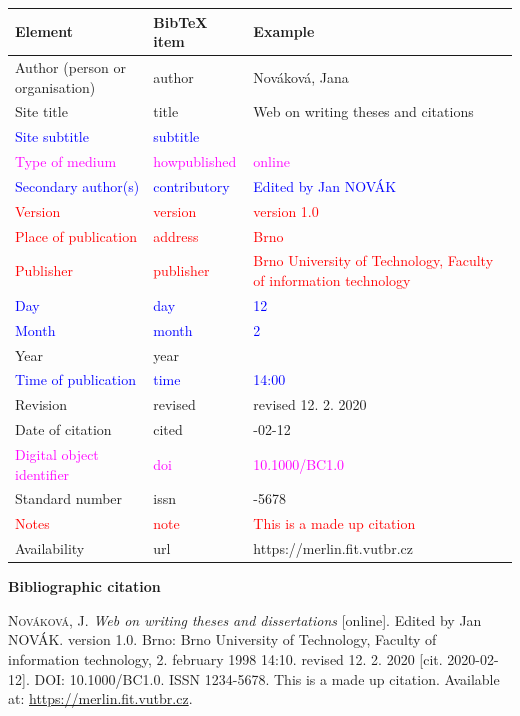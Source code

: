 \begin{tabularx}{0.95\linewidth}{X X >{\raggedright\arraybackslash}X}
    Element & BibTeX item & Example\\\hline
    Author (person or organisation) & author & Nováková, Jana\\
    Site title & title & Web on writing theses and citations\\
    \textcolor{blue}{Site subtitle} &  \textcolor{blue}{subtitle} & \\
    \textcolor{magenta}{Type of medium} & \textcolor{magenta}{howpublished} & \textcolor{magenta}{online}\\
    \textcolor{blue}{Secondary author(s)} & \textcolor{blue}{contributory} & \textcolor{blue}{Edited by Jan NOVÁK}\\
    \textcolor{red}{Version} & \textcolor{red}{version} & \textcolor{red}{version 1.0}\\
    \textcolor{red}{Place of publication} & \textcolor{red}{address} & \textcolor{red}{Brno}\\
    \textcolor{red}{Publisher} & \textcolor{red}{publisher} & \textcolor{red}{Brno University of Technology, Faculty of information technology}\\
    \textcolor{blue}{Day} & \textcolor{blue}{day} & \textcolor{blue}{12}\\
    \textcolor{blue}{Month} & \textcolor{blue}{month} & \textcolor{blue}{2}\\
    Year & year & 2020\\
    \textcolor{blue}{Time of publication} & \textcolor{blue}{time} & \textcolor{blue}{14:00}\\
    Revision & revised & revised 12. 2. 2020\\
    Date of citation & cited & 2020-02-12\\
    \textcolor{magenta}{Digital object identifier} & \textcolor{magenta}{doi} & \textcolor{magenta}{10.1000/BC1.0}\\
    Standard number & issn & 1234-5678\\
    \textcolor{red}{Notes} & \textcolor{red}{note} & \textcolor{red}{This is a made up citation}\\
    Availability & url & https://merlin.fit.vutbr.cz
\end{tabularx}

\bigskip

\noindent \textbf{Bibliographic citation}

\medskip

\noindent \textsc{Nováková}, J. \textit{Web on writing theses and dissertations} [online]. Edited by Jan NOVÁK. version 1.0. Brno: Brno University of Technology, Faculty of information technology, 2. february 1998 14:10. revised 12. 2. 2020 [cit. 2020-02-12]. DOI: 10.1000/BC1.0. ISSN 1234-5678. This is a made up citation. Available at: \url{https://merlin.fit.vutbr.cz}.

%
